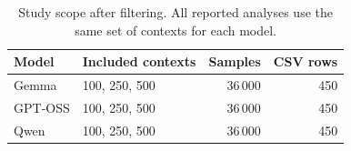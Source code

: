 \begin{table}[t]
    \centering
    \caption{Study scope after filtering. All reported analyses use the same set of contexts for each model.}
    \label{tab:study-scope}
    \small
    \begin{tabular}{llrr}
        \toprule
        Model & Included contexts & Samples & CSV rows \\
        \midrule
        Gemma & 100, 250, 500 & 36\,000 & 450 \\
        GPT-OSS & 100, 250, 500 & 36\,000 & 450 \\
        Qwen & 100, 250, 500 & 36\,000 & 450 \\
        \bottomrule
    \end{tabular}
\end{table}
